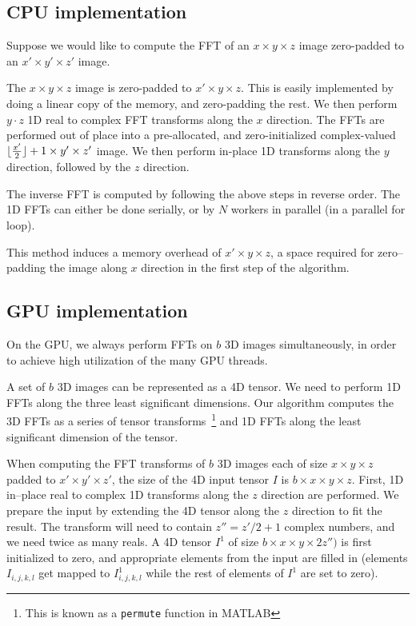 \documentclass[conference]{./IEEEtran/IEEEtran}
\DeclarePairedDelimiter{\floor}{\lfloor}{\rfloor}
\begin{document}
  \subsection{CPU implementation}

  Suppose we would like to compute the FFT of an $x \times y \times z$
  image zero-padded to an $x' \times y' \times z'$ image.

  The $x \times y \times z$ image is zero-padded to $x' \times
  y \times z$.  This is easily implemented by doing a linear copy of
  the memory, and zero-padding the rest. We then perform $y \cdot z$
  1D real to complex FFT transforms along the $x$ direction.  The FFTs
  are performed out of place into a pre-allocated, and
  zero-initialized complex-valued $\floor{\frac{x'}{2}} + 1 \times
  y' \times z'$ image.  We then perform in-place 1D transforms along
  the $y$ direction, followed by the $z$ direction.

  The inverse FFT is computed by following the above steps in reverse
  order.  The 1D FFTs can either be done serially, or by $N$ workers
  in parallel (in a parallel for loop).

  This method induces a memory overhead of $x' \times y \times z$, a
  space required for zero--padding the image along $x$ direction in
  the first step of the algorithm.


  \subsection{GPU implementation}

  \label{sec:gpu-fft-impl}

  On the GPU, we always perform FFTs on $b$ 3D images simultaneously,
  in order to achieve high utilization of the many GPU threads.

  A set of $b$ 3D images can be represented as a 4D tensor.  We need
  to perform 1D FFTs along the three least significant dimensions.
  Our algorithm computes the 3D FFTs as a series of tensor
  transforms~\footnote{This is known as a \texttt{permute} function in
    MATLAB} and 1D FFTs along the least significant dimension of the
  tensor.

  When computing the FFT transforms of $b$ 3D images each of size $x
  \times y \times z$ padded to $x' \times y' \times z'$, the size of
  the 4D input tensor $I$ is $b \times x \times y \times z$.  First,
  1D in--place real to complex 1D transforms along the $z$ direction
  are performed.  We prepare the input by extending the 4D tensor
  along the $z$ direction to fit the result.  The transform will need
  to contain $z'' = z' / 2 + 1$ complex numbers, and we need twice as
  many reals.  A 4D tensor $I^1$ of size $b \times x \times y \times
  2z'')$ is first initialized to zero, and appropriate elements from
  the input are filled in (elements $I_{i,j,k,l}$ get mapped to
  $I^1_{i,j,k,l}$ while the rest of elements of $I^1$ are set to
  zero).
\end{document}
